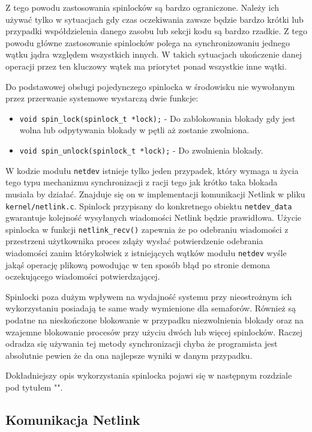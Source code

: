 \documentclass[10pt]{article}
\begin{document}
Z tego powodu zastosowania spinlocków są bardzo ograniczone. Należy ich używać tylko w sytuacjach gdy czas oczekiwania zawsze będzie bardzo krótki lub przypadki współdzielenia danego zasobu lub sekcji kodu są bardzo rzadkie. Z tego powodu główne zastosowanie spinlocków polega na synchronizowaniu jednego wątku jądra względem wszystkich innych. W takich sytuacjach ukończenie danej operacji przez ten kluczowy wątek ma priorytet ponad wszystkie inne wątki.

Do podstawowej obsługi pojedynczego spinlocka w środowisku nie wywołanym przez przerwanie systemowe wystarczą dwie funkcje:

\begin{itemize}
\itemsep1pt\parskip0pt
\item
  \texttt{void spin\_lock(spinlock\_t *lock);} - Do zablokowania blokady gdy jest wolna lub odpytywania blokady w pętli aż zostanie zwolniona.
\item
  \texttt{void spin\_unlock(spinlock\_t *lock);} - Do zwolnienia blokady.
\end{itemize}

W kodzie modułu \texttt{netdev} istnieje tylko jeden przypadek, który wymaga u życia tego typu mechanizmu synchronizacji z racji tego jak krótko taka blokada musiała by działać. Znajduje się on w implementacji komunikacji Netlink w pliku \texttt{kernel/netlink.c}. Spinlock przypisany do konkretnego obiektu \texttt{netdev\_data} gwarantuje kolejność wysyłanych wiadomości Netlink będzie prawidłowa. Użycie spinlocka w funkcji \texttt{netlink\_recv()} zapewnia że po odebraniu wiadomości z przestrzeni użytkownika proces zdąży wysłać potwierdzenie odebrania wiadomości zanim którykolwiek z istniejących wątków modułu \texttt{netdev} wyśle jakąś operację plikową powodując w ten sposób błąd po stronie demona oczekującego wiadomości potwierdzającej.

Spinlocki poza dużym wpływem na wydajność systemu przy nieostrożnym ich wykorzystaniu posiadają te same wady wymienione dla semaforów. Również są podatne na nieskończone blokowanie w przypadku niezwolnienia blokady oraz na wzajemne blokowanie procesów przy użyciu dwóch lub więcej spinlocków. Raczej odradza się używania tej metody synchronizacji chyba że programista jest absolutnie pewien że da ona najlepsze wyniki w danym przypadku.

Dokładniejszy opis wykorzystania spinlocka pojawi się w następnym rozdziale pod tytułem "".

\subsection{Komunikacja Netlink}
\label{netlinkcomm}
\end{document}
